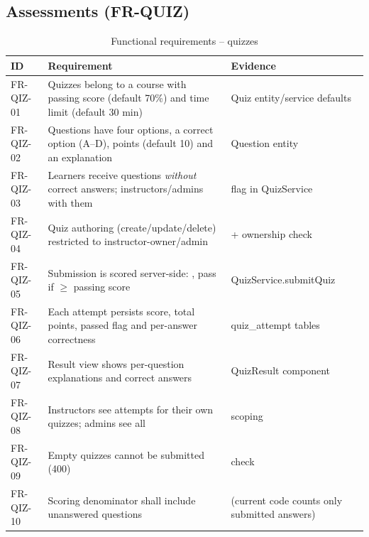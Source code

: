 \subsection{Assessments (FR-QUIZ)}
\begin{table}[H]
\centering
\caption{Functional requirements -- quizzes}
\label{tab:fr-quiz}
\begin{tabular}{@{}C{1.5cm}L{8.6cm}L{3.9cm}@{}}
\toprule
\textbf{ID} & \textbf{Requirement} & \textbf{Evidence} \\
\midrule
FR-QIZ-01 & Quizzes belong to a course with passing score (default 70\%) and time limit (default 30 min) & Quiz entity/service defaults \\
FR-QIZ-02 & Questions have four options, a correct option (A--D), points (default 10) and an explanation & Question entity \\
FR-QIZ-03 & Learners receive questions \emph{without} correct answers; instructors/admins with them &  flag in QuizService \\
FR-QIZ-04 & Quiz authoring (create/update/delete) restricted to instructor-owner/admin &  + ownership check \\
FR-QIZ-05 & Submission is scored server-side: , pass if $\geq$ passing score & QuizService.submitQuiz \\
FR-QIZ-06 & Each attempt persists score, total points, passed flag and per-answer correctness & quiz\_attempt tables \\
FR-QIZ-07 & Result view shows per-question explanations and correct answers & QuizResult component \\
FR-QIZ-08 & Instructors see attempts for their own quizzes; admins see all &  scoping \\
FR-QIZ-09 & Empty quizzes cannot be submitted (400) &  check \\
FR-QIZ-10 & Scoring denominator shall include unanswered questions &  (current code counts only submitted answers) \\
\bottomrule
\end{tabular}
\end{table}

